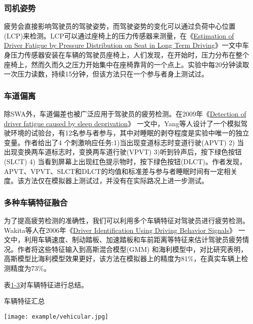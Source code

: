 \subsubsection{司机姿势}

疲劳会直接影响驾驶员的驾驶姿势，而驾驶姿势的变化可以通过负荷中心位置(LCP)来检测。LCP可以通过座椅上的压力传感器来测量，在《\href{https://xueshu.baidu.com/usercenter/paper/show?paperid=b2bc2c266ebbbf17c1b5f6837af20612&site=xueshu_se&hitarticle=1}{Estimation of Driver Fatigue by Pressure Distribution on Seat in Long Term Driving}》一文中车身压力传感器安装在车辆的驾驶员座椅上，人们发现，在开始时，压力分布在整个座椅上，然而久而久之压力开始集中在座椅靠背的一个点上。实验中每20分钟读取一次压力读数，持续15分钟，但该方法只在一个参与者身上测试过。

\subsubsection{车道偏离}

除SWA外，车道偏差也被广泛应用于驾驶员的疲劳检测。在2009年《\href{https://xueshu.baidu.com/usercenter/paper/show?paperid=d275df140848b004c3b9deb6c9f9f365&site=xueshu_se}{Detection of driver fatigue caused by sleep deprivation}》 一文中，Yang等人设计了一个模拟驾驶环境的试验台，有12名参与者参与，其中对睡眠的剥夺程度是实验中唯一的独立变量。作者给出了4 个刺激响应任务:1)当出现变道标志时变道行驶(APVT) 2) 当出现变换两车道标志时，变换两车道行驶(VPVT) 3)听到铃声后，按下绿色按钮(SLCT) 4) 当看到屏幕上出现红色提示物时，按下绿色按钮(DLCT)。作者发现，APVT、VPVT、SLCT和DLCT的均值和标准差与参与者睡眠时间有一定相关度。该方法仅在模拟器上测试过，并没有在实际路况上进一步测试。

\subsubsection{多种车辆特征融合}

为了提高疲劳检测的准确性，我们可以利用多个车辆特征对驾驶员进行疲劳检测。Wakita等人在2006年《\href{https://xueshu.baidu.com/usercenter/paper/show?paperid=545e342c13b390e67fa55f6f79a851e4&site=xueshu_se}{Driver Identification Using Driving Behavior Signals}》 一文中，利用车辆速度、制动踏板、加速踏板和车前距离等特征来估计驾驶员疲劳情况。作者将这些特征输入到高斯混合模型(GMM) 和海利模型中，对比研究表明，高斯模型比海利模型效果更好，该方法在模拟器上的精度为81$\%$，在真实车辆上检测精度为73$\%$。

表\href{table:1-3}{1-3}对车辆特征进行总结。


\begin{table}[!htp]

\centering
\caption{车辆特征汇总}
\texttt{[image: example/vehicular.jpg]}
\label{table:1-3}

\end{table}

